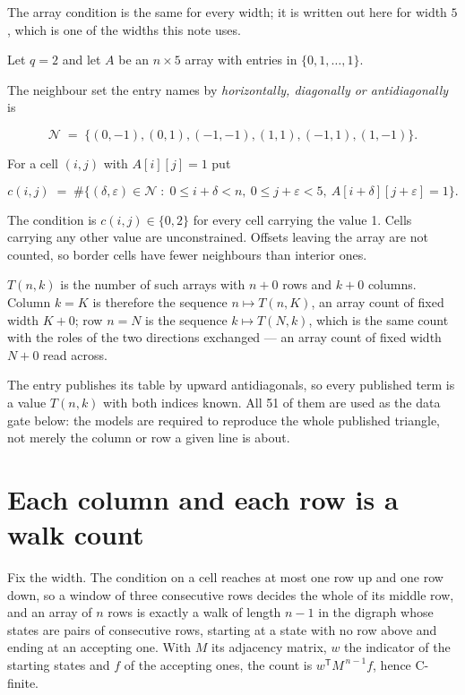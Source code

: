 \documentclass[11pt]{article}
\theoremstyle{definition}
\begin{document}
The array condition is the same for every width; it is written out here for width $5$, which is one of the widths this note uses.

Let $q = 2$ and let $A$ be an $n \times 5$ array with entries in $\{0,1,\dots,1\}$.

The neighbour set the entry names by {\itshape horizontally, diagonally or antidiagonally} is

\[\mathcal{N} \;=\; \{(0,-1), (0,1), (-1,-1), (1,1), (-1,1), (1,-1)\}.\]

For a cell $(i,j)$ with $A[i][j] = 1$ put

\[c(i,j) \;=\; \#\bigl\{(\delta,\varepsilon)\in\mathcal{N} \;:\; 0\le i+\delta<n,\ 0\le j+\varepsilon<5,\ A[i+\delta][j+\varepsilon] = 1\bigr\}.\]

The condition is $c(i,j) \in \{0, 2\}$ for every cell carrying the value 1. Cells carrying any other value are unconstrained. Offsets leaving the array are not counted, so border cells have fewer neighbours than interior ones.

$T(n,k)$ is the number of such arrays with $n + 0$ rows and $k + 0$ columns. Column $k = K$ is therefore the sequence $n \mapsto T(n,K)$, an array count of fixed width $K + 0$; row $n = N$ is the sequence $k \mapsto T(N,k)$, which is the same count with the roles of the two directions exchanged --- an array count of fixed width $N + 0$ read across.

The entry publishes its table by upward antidiagonals, so every published term is a value $T(n,k)$ with both indices known. All 51 of them are used as the data gate below: the models are required to reproduce the whole published triangle, not merely the column or row a given line is about.

\section{Each column and each row is a walk count}

Fix the width. The condition on a cell reaches at most one row up and one row down, so a window of three consecutive rows decides the whole of its middle row, and an array of $n$ rows is exactly a walk of length $n-1$ in the digraph whose states are pairs of consecutive rows, starting at a state with no row above and ending at an accepting one. With $M$ its adjacency matrix, $w$ the indicator of the starting states and $f$ of the accepting ones, the count is $w^{\mathsf T}M^{\,n-1}f$, hence C-finite.
\end{document}
